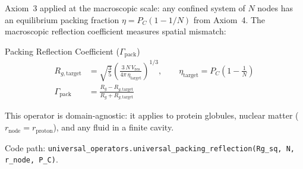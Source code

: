 Axiom~3 applied at the macroscopic scale: any confined system of $N$
nodes has an equilibrium packing fraction $\eta = P_C(1 - 1/N)$ from
Axiom~4.  The macroscopic reflection coefficient measures spatial
mismatch:
\begin{resultbox}{Packing Reflection Coefficient ($\Gamma_\text{pack}$)}
\begin{align}
    R_{g,\text{target}} &= \sqrt{\tfrac{3}{5}}\left(
      \frac{3\,N\,V_\text{res}}{4\pi\,\eta_\text{target}}
    \right)^{1/3}, \qquad
    \eta_\text{target} = P_C\!\left(1 - \frac{1}{N}\right)
    \label{eq:rg_target} \\[4pt]
    \Gamma_\text{pack} &= \frac{R_g - R_{g,\text{target}}}
                              {R_g + R_{g,\text{target}}}
    \label{eq:gamma_pack}
\end{align}
\end{resultbox}

This operator is domain-agnostic: it applies to protein globules,
nuclear matter ($r_\text{node} = r_\text{proton}$), and any fluid in a
finite cavity.

Code path: \texttt{universal\_operators.universal\_packing\_reflection(Rg\_sq, N, r\_node, P\_C)}.

